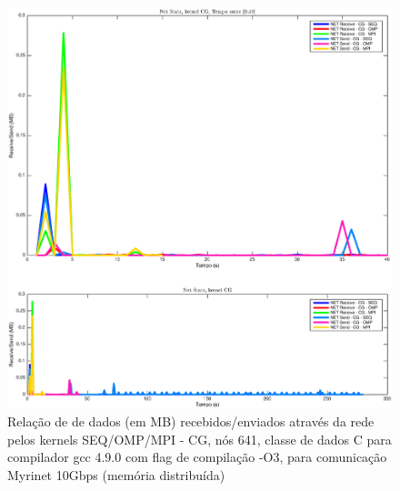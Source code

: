 \documentclass[conference,compsoc]{IEEEtran}
\begin{document}
\begin{figure}[H]
\centering
\includegraphics[width=1.1\columnwidth]{EPS/dstat_CG_seq_vs_omp_vs_mpi/net.eps}
\caption{Relação de de dados (em MB) recebidos/enviados através da rede pelos kernels SEQ/OMP/MPI - CG, nós 641, classe de dados C para compilador gcc 4.9.0 com flag de compilação  -O3, para comunicação Myrinet 10Gbps (memória distribuída)}
\label{dstat_cg_SOM_net}
\end{figure}
\end{document}
